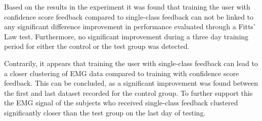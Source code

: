 Based on the results in the experiment it was found that training the user with confidence score feedback compared to single-class feedback can not be linked to any significant difference improvement in performance evaluated through a Fitts' Law test. Furthermore, no significant improvement during a three day training period for either the control or the test group was detected. 

Contrarily, it appears that training the user with single-class feedback can lead to a closer clustering of EMG data compared to training with confidence score feedback. This can be concluded, as a significant improvement was found between the first and last dataset recorded for the control group. To further support this the EMG signal of the subjects who received single-class feedback clustered significantly closer than the test group on the last day of testing.
